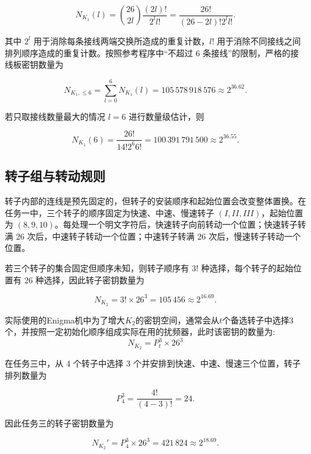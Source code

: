 \begin{equation*}
    N_{K_1}(l)=\binom{26}{2l}\frac{(2l)!}{2^l l!}
    =\frac{26!}{(26-2l)!2^l l!}.
\end{equation*}

其中 $2^l$ 用于消除每条接线两端交换所造成的重复计数，$l!$ 用于消除不同接线之间排列顺序造成的重复计数。按照参考程序中“不超过 6 条接线”的限制，严格的接线板密钥数量为

\begin{equation*}
    N_{K_1,\leq 6}=\sum_{l=0}^{6}N_{K_1}(l)
    =105\,578\,918\,576\approx2^{36.62}.
\end{equation*}

若只取接线数量最大的情况 $l=6$ 进行数量级估计，则

\begin{equation*}
    N_{K_1}(6)=\frac{26!}{14!2^6 6!}
    =100\,391\,791\,500\approx2^{36.55}.
\end{equation*}

\subsection{转子组与转动规则}

转子内部的连线是预先固定的，但转子的安装顺序和起始位置会改变整体置换。在任务一中，三个转子的顺序固定为快速、中速、慢速转子 $(I,II,III)$，起始位置为 $(8,9,10)$。每处理一个明文字符后，快速转子向前转动一个位置；快速转子转满 26 次后，中速转子转动一个位置；中速转子转满 26 次后，慢速转子转动一个位置。

若三个转子的集合固定但顺序未知，则转子顺序有 $3!$ 种选择，每个转子的起始位置有 26 种选择，因此转子密钥数量为

\begin{equation*}
    N_{K_2}=3!\times26^3=105\,456\approx2^{16.69}.
\end{equation*}

实际使用的Enigma机中为了增大$K_2$的密钥空间，通常会从$t$个备选转子中选择$3$个，并按照一定初始化顺序组成实际在用的扰频器，此时该密钥的数量为:
\begin{equation*}
    N_{K_2}  =  P_t^3 \times 26^3
\end{equation*}

在任务三中，从 4 个转子中选择 3 个并安排到快速、中速、慢速三个位置，转子排列数量为

\begin{equation*}
    P_4^3=\frac{4!}{(4-3)!}=24.
\end{equation*}

因此任务三的转子密钥数量为

\begin{equation*}
    N_{K_2}'=P_4^3\times26^3=421\,824\approx2^{18.69}.
\end{equation*}

